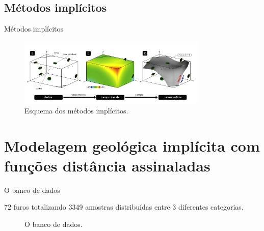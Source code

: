 \documentclass[aspectratio=169]{beamer}
\begin{document}
\subsection{Métodos implícitos}

\begin{frame}{Métodos implícitos}
	\begin{figure}[H]
		\begin{center}
			\includegraphics[width=0.8\textwidth]{capitulo_1/implicit_modelig_pt_1}
			\caption{Esquema dos métodos implícitos.}
		\end{center}
	\end{figure}
\end{frame}

\section{Modelagem geológica implícita com funções distância assinaladas}

\begin{frame}{O banco de dados}

72 furos totalizando 3349 amostras distribuídas entre 3 diferentes categorias.

	\begin{figure}
		\centering
		\hspace{20mm}
		\caption{O banco de dados.}
	\end{figure}
		
\end{frame}
\end{document}
